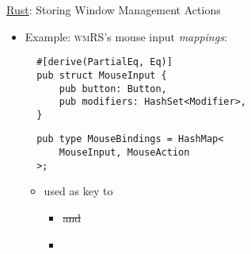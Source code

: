 \begin{frame}[fragile]{\underline{Rust}: Storing Window Management Actions \hfill {\footnotesize \currentname}}


    \begin{itemize}

        \item Example: \textsc{wmRS}'s mouse input \textit{mappings}:\\[3pt]
\begin{verbatim}
  #[derive(PartialEq, Eq)]
  pub struct MouseInput {
      pub button: Button,
      pub modifiers: HashSet<Modifier>,
  }
\end{verbatim}
\begin{verbatim}
  pub type MouseBindings = HashMap<
      MouseInput, MouseAction
  >;
\end{verbatim}

    \vspace*{5pt}\begin{itemize}

        \item {} used as key to 
            \begin{itemize}
                \item \sout<2>{ and } 
                \item {} 
            \end{itemize}

    \end{itemize}

    \end{itemize}

    \vfill

\end{frame}
